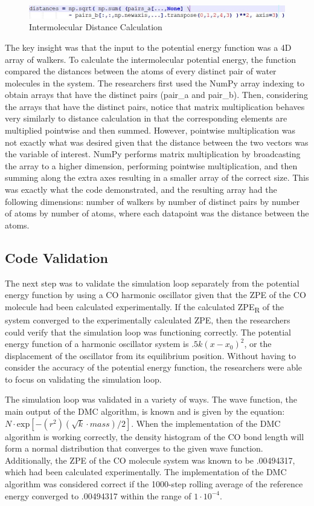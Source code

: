 \documentclass[journal=jacsat,manuscript=article]{achemso}
\begin{document}
\begin{figure}[H]
  \caption{Intermolecular Distance Calculation}
  \includegraphics[width=\linewidth]{figures/distances.jpg}
\end{figure}

The key insight was that the input to the potential energy function was a 4D array of walkers. To calculate the intermolecular potential energy, the function compared the distances between the atoms of every distinct pair of water molecules in the system. The researchers first used the NumPy array indexing to obtain arrays that have the distinct pairs (pair\_a and pair\_b). Then, considering the arrays that have the distinct pairs, notice that matrix multiplication behaves very similarly to distance calculation in that the corresponding elements are multiplied pointwise and then summed. However, pointwise multiplication was not exactly what was desired given that the distance between the two vectors was the variable of interest. NumPy performs matrix multiplication by broadcasting the array to a higher dimension, performing pointwise multiplication, and then summing along the extra axes resulting in a smaller array of the correct size. This was exactly what the code demonstrated, and the resulting array had the following dimensions: number of walkers by number of distinct pairs by number of atoms by number of atoms, where each datapoint was the distance between the atoms.

\subsection{Code Validation}

The next step was to validate the simulation loop separately from the potential energy function by using a CO harmonic oscillator given that the ZPE of the CO molecule had been calculated experimentally. If the calculated ZPE\textsubscript{R} of the system converged to the experimentally calculated ZPE, then the researchers could verify that the simulation loop was functioning correctly. The potential energy function of a harmonic oscillator system is $.5k(x-x_0)^2$, or the displacement of the oscillator from its equilibrium position. Without having to consider the accuracy of the potential energy function, the researchers were able to focus on validating the simulation loop. 
	
The simulation loop was validated in a variety of ways. The wave function, the main output of the DMC algorithm, is known and is given by the equation: $N\cdot \text{exp}[-(r^2)(\sqrt k\cdot mass)/2]$. When the implementation of the DMC algorithm is working correctly, the density histogram of the CO bond length will form a normal distribution that converges to the given wave function. Additionally, the ZPE of the CO molecule system was known to be .00494317, which had been calculated experimentally\cite{Madison2020}. The implementation of the DMC algorithm was considered correct if the 1000-step rolling average of the reference energy converged to .00494317 within the range of $1\cdot10^{-4}$\cite{Madison2020}. 
	
\end{document}
